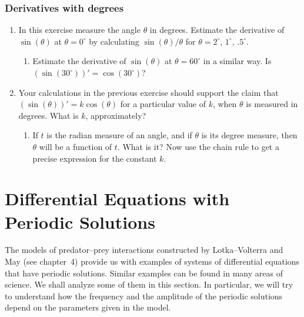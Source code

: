 \subsubsection{Derivatives with degrees}
\label{subsubsec:derivatives-with-degrees}




\begin{enumerate}
\item In this exercise measure the angle $\theta$ in degrees.
Estimate the derivative of $\sin(\theta)$ at $\theta = 0^{\circ}$ by
calculating $\sin(\theta)/\theta$ for $\theta = 2^{\circ}$,
$1^{\circ}$, $.5^{\circ}$.

  \begin{enumerate}
  \item Estimate the derivative of $\sin(\theta)$ at $\theta =
60^{\circ}$ in a similar way.  Is $(\sin(30^{\circ}))' =
\cos(30^{\circ})$?


\end{enumerate}
\item Your calculations in the previous exercise should support the
claim that $(\sin(\theta))' = k\cos(\theta)$ for a particular value of
$k$, when $\theta$ is measured in degrees.  What is $k$,
approximately?

  \begin{enumerate}
  \item If $t$ is the radian measure of an angle, and if
$\theta$ is its degree measure, then $\theta$ will be a function of
$t$.  What is it?  Now use the chain rule to get a precise expression
for the constant $k$.




\end{enumerate}
\end{enumerate}
\section{Differential Equations with Periodic \mbox{Solutions}}
\label{sec:differential-equations-with-periodic-mboxsolutions}

The models of predator--prey interactions constructed by Lotka--Volterra
and May (see chapter~4) provide us with examples of systems of
differential equations that have periodic solutions.  Similar examples
can be found in many areas of science.  We shall analyze some of them
in this section.  In particular, we will try to understand how the
frequency and the amplitude of the periodic solutions depend on the
parameters given in the model.


